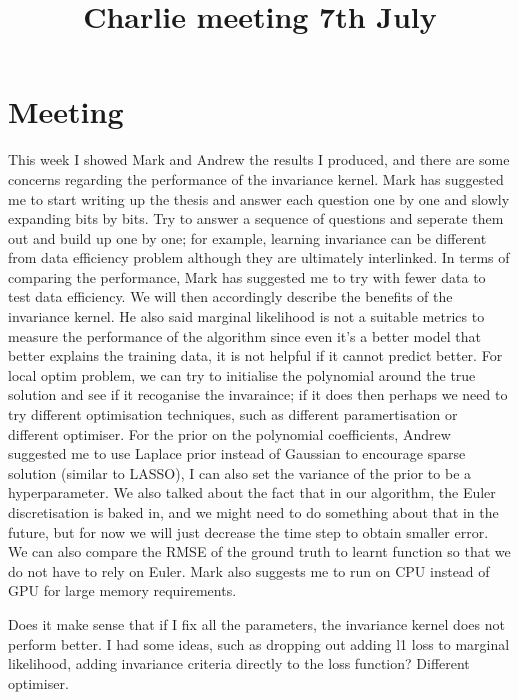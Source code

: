 \documentclass{article}
\title{\vspace{-3cm}Charlie meeting 7th July\vspace{-3em}}
\author{}
\date{}
\begin{document}
\maketitle
\section*{Meeting}
This week I showed Mark and Andrew the results I produced, and there are some concerns regarding the performance of the invariance kernel. 
Mark has suggested me to start writing up the thesis and answer each question one by one and slowly expanding bits by bits. 
Try to answer a sequence of questions and seperate them out and build up one by one; for example, learning invariance can be different from data efficiency problem although they are ultimately interlinked.  
In terms of comparing the performance, Mark has suggested me to try with fewer data to test data efficiency. 
We will then accordingly describe the benefits of the invariance kernel.
He also said marginal likelihood is not a suitable metrics to measure the performance of the algorithm since even it's a better model that better explains the training data, it is not helpful if it cannot predict better. 
For local optim problem, we can try to initialise the polynomial around the true solution and see if it recoganise the invaraince; if it does then perhaps we need to try different optimisation techniques, such as different paramertisation or different optimiser. 
For the prior on the polynomial coefficients, Andrew suggested me to use Laplace prior instead of Gaussian to encourage sparse solution (similar to LASSO), I can also set the variance of the prior to be a hyperparameter.
We also talked about the fact that in our algorithm, the Euler discretisation is baked in, and we might need to do something about that in the future, but for now we will just decrease the time step to obtain smaller error. 
We can also compare the RMSE of the ground truth to learnt function so that we do not have to rely on Euler.
Mark also suggests me to run on CPU instead of GPU for large memory requirements.

Does it make sense that if I fix all the parameters, the invariance kernel does not perform better.
I had some ideas, such as dropping out adding l1 loss to marginal likelihood, adding invariance criteria directly to the loss function? Different optimiser.
\end{document}
